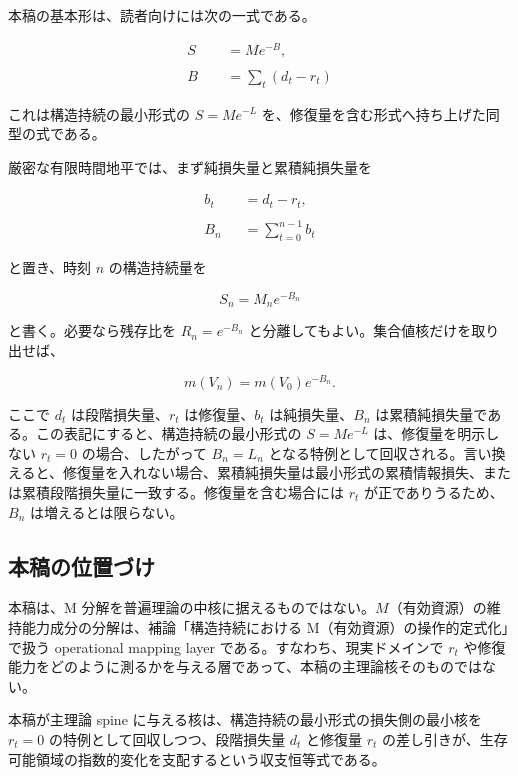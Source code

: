 \documentclass[12pt,a4paper]{article}
\begin{document}
本稿の基本形は、読者向けには次の一式である。

\[
\begin{aligned}
S &= M e^{-B}, \\
\qquad \\
B &= \sum_{t}(d_{t}-r_{t})
\end{aligned}
\]

これは構造持続の最小形式の \(S=Me^{-L}\) を、修復量を含む形式へ持ち上げた同型の式である。

厳密な有限時間地平では、まず純損失量と累積純損失量を

\[
\begin{aligned}
b_{t} &= d_{t} - r_{t}, \\
\qquad \\
B_{n} &= \sum_{t=0}^{n-1} b_{t}
\end{aligned}
\]

と置き、時刻 \(n\) の構造持続量を

\[
S_{n} = M_{n} e^{-B_{n}}
\]

と書く。必要なら残存比を \(R_{n}=e^{-B_{n}}\) と分離してもよい。集合値核だけを取り出せば、

\[
m(V_{n}) = m(V_0) e^{-B_{n}}.
\]

ここで \(d_{t}\) は段階損失量、\(r_{t}\) は修復量、\(b_{t}\) は純損失量、\(B_{n}\) は累積純損失量である。この表記にすると、構造持続の最小形式の \(S=Me^{-L}\) は、修復量を明示しない \(r_{t}=0\) の場合、したがって \(B_{n}=L_{n}\) となる特例として回収される。言い換えると、修復量を入れない場合、累積純損失量は最小形式の累積情報損失、または累積段階損失量に一致する。修復量を含む場合には \(r_{t}\) が正でありうるため、\(B_{n}\) は増えるとは限らない。

\subsection{本稿の位置づけ}\label{ux672cux7a3fux306eux4f4dux7f6eux3065ux3051}

本稿は、M 分解を普遍理論の中核に据えるものではない。\(M\)（有効資源）の維持能力成分の分解は、補論「構造持続における M（有効資源）の操作的定式化」で扱う operational mapping layer である。すなわち、現実ドメインで \(r_{t}\) や修復能力をどのように測るかを与える層であって、本稿の主理論核そのものではない。

本稿が主理論 spine に与える核は、構造持続の最小形式の損失側の最小核を \(r_{t}=0\) の特例として回収しつつ、段階損失量 \(d_{t}\) と修復量 \(r_{t}\) の差し引きが、生存可能領域の指数的変化を支配するという収支恒等式である。
\end{document}
